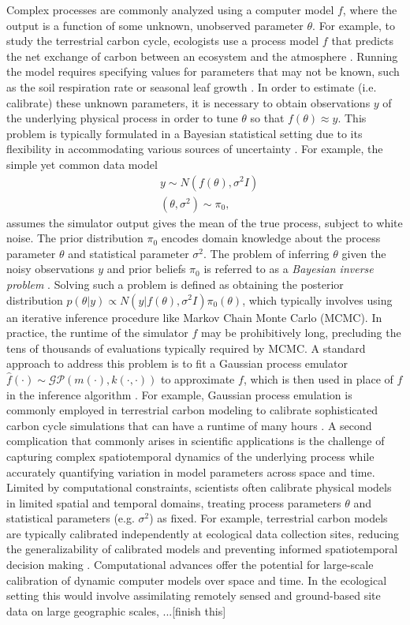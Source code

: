 \documentclass[12pt]{article}
\begin{document}
Complex processes are commonly analyzed using a computer model $f$, where the output is a function of some unknown, unobserved parameter $\theta$.
For example, to study the terrestrial carbon cycle, ecologists use a process model $f$ 
that predicts the net exchange of carbon between an ecosystem and the atmosphere \cite{Friedlingstein, Waring}. Running the model requires specifying values for parameters that 
may not be known, such as the soil respiration rate or seasonal leaf growth \cite{Fer}. In order to estimate (i.e. calibrate) these unknown parameters, it is necessary to obtain observations $y$ 
of the underlying physical process in order to tune $\theta$ so that $f(\theta) \approx y$. This problem is typically formulated in a Bayesian statistical setting due to its flexibility in accommodating
various sources of uncertainty \cite{Kennedy, Clark}. For example, the simple yet common data model\begin{align*}
&y \sim N(f(\theta), \sigma^2 I) \\
&(\theta, \sigma^2) \sim \pi_0,
\end{align*}
assumes the simulator output gives the mean of the true process, subject to white noise. The prior distribution $\pi_0$ encodes domain knowledge about the 
process parameter $\theta$ and statistical parameter $\sigma^2$. The problem of inferring $\theta$ given the noisy observations $y$ and prior beliefs $\pi_0$ is referred to as a \textit{Bayesian inverse problem} \cite{Stuart}. Solving such a problem is defined 
 as obtaining the posterior distribution $p(\theta|y) \propto N(y|f(\theta), \sigma^2 I)\pi_0(\theta)$, which typically involves using an iterative inference procedure like Markov Chain Monte Carlo (MCMC). In practice, the runtime of the simulator $f$ may be prohibitively long, precluding the tens of thousands of evaluations typically required by MCMC. A standard approach to address this problem is to fit a Gaussian process 
emulator $\hat{f}(\cdot) \sim \mathcal{GP}(m(\cdot), k(\cdot, \cdot))$ to approximate $f$, which is then used in place of $f$ in the inference algorithm \cite{Kennedy, Fer, Cleary}. For example, Gaussian process emulation is commonly employed in terrestrial carbon modeling to calibrate sophisticated carbon cycle simulations that can have a runtime of many hours \cite{Fer}. A second complication that commonly arises in scientific applications is the challenge of capturing complex spatiotemporal dynamics of the underlying process while accurately quantifying variation in model parameters across space and time. 
Limited by computational constraints, scientists often calibrate physical models in limited spatial and temporal domains, treating process parameters $\theta$ and statistical parameters (e.g. $\sigma^2$) as fixed. For example, terrestrial carbon models are typically calibrated independently at ecological data collection sites, reducing the generalizability of calibrated models and preventing informed spatiotemporal decision making \cite{Fer2}. Computational advances offer the potential for large-scale calibration of dynamic computer models over space and time. In the ecological setting this would involve assimilating remotely sensed and ground-based site data on large geographic scales, ...[finish this]
\end{document}
